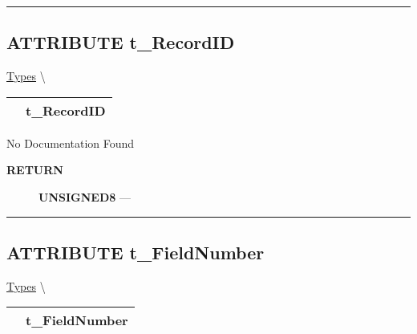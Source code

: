 \rule{\linewidth}{0.5pt}

\subsection*{\textsf{\colorbox{headtoc}{\color{white} ATTRIBUTE}
t\_RecordID}}

\hypertarget{ecldoc:ml_core.types.t_recordid}{}
\hspace{0pt} \hyperlink{ecldoc:ML_Core.Types}{Types} \textbackslash 

{\renewcommand{\arraystretch}{1.5}
\begin{tabularx}{\textwidth}{|>{\raggedright\arraybackslash}l|X|}
\hline
\hspace{0pt}\mytexttt{\color{red} } & \textbf{t\_RecordID} \\
\hline
\end{tabularx}
}

\par





No Documentation Found








\par
\begin{description}
\item [\colorbox{tagtype}{\color{white} \textbf{\textsf{RETURN}}}] \textbf{UNSIGNED8} --- 
\end{description}




\rule{\linewidth}{0.5pt}
\subsection*{\textsf{\colorbox{headtoc}{\color{white} ATTRIBUTE}
t\_FieldNumber}}

\hypertarget{ecldoc:ml_core.types.t_fieldnumber}{}
\hspace{0pt} \hyperlink{ecldoc:ML_Core.Types}{Types} \textbackslash 

{\renewcommand{\arraystretch}{1.5}
\begin{tabularx}{\textwidth}{|>{\raggedright\arraybackslash}l|X|}
\hline
\hspace{0pt}\mytexttt{\color{red} } & \textbf{t\_FieldNumber} \\
\hline
\end{tabularx}
}

\par





